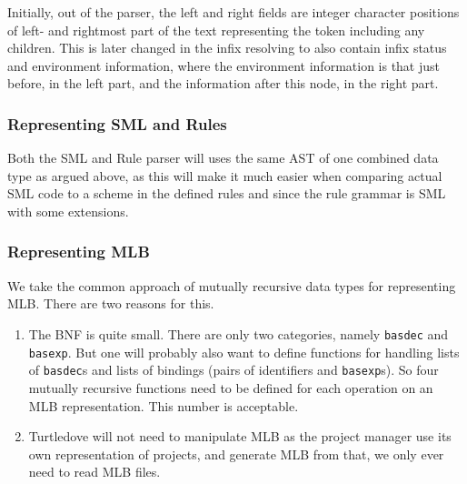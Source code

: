 Initially, out of the parser, the left and right fields are integer character
positions of left- and rightmost part of the text representing the token
including any children. This is later changed in the infix resolving to also
contain infix status and environment information, where the environment
information is that just before, in the left part, and the information after
this node, in the right part.

\subsubsection{Representing SML and Rules}
Both the SML and Rule parser will uses the same AST of one combined data type as
argued above, as this will make it much easier
when comparing actual SML code to a scheme in the defined rules and since the
rule grammar is SML with some extensions.

\subsubsection{Representing MLB}

We take the common approach of mutually recursive data types for representing
MLB. There are two reasons for this.

\begin{enumerate}
\item The BNF is quite small. There are only two categories, namely
  \texttt{basdec} and \texttt{basexp}. But one will probably also want to define
  functions for handling lists of \texttt{basdec}s and lists of bindings (pairs
  of identifiers and \texttt{basexp}s). So four mutually recursive functions
  need to be defined for each operation on an MLB representation. This number is
  acceptable.
\item Turtledove will not need to manipulate MLB as the project manager use its
  own representation of projects, and generate MLB from that, we only ever need
  to read MLB files.
\end{enumerate}


